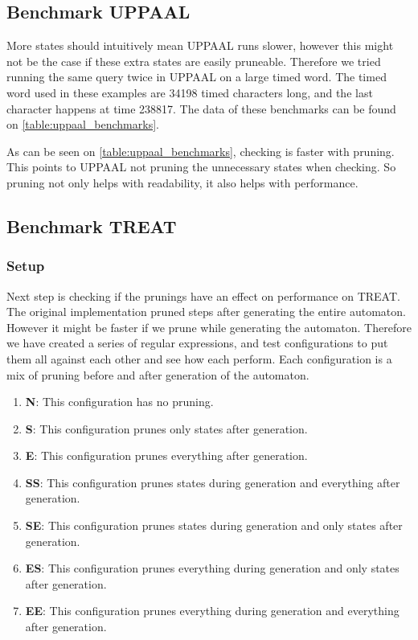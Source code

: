 \subsection{Benchmark UPPAAL}\label{sub:benchmark_uppaal}
More states should intuitively mean UPPAAL runs slower, however this might not be the case if these extra states are easily pruneable.
Therefore we tried running the same query twice in UPPAAL on a large timed word.
The timed word used in these examples are 34198 timed characters long, and the last character happens at time 238817.
The data of these benchmarks can be found on \cref{table:uppaal_benchmarks}.



As can be seen on \cref{table:uppaal_benchmarks}, checking is faster with pruning.
This points to UPPAAL not pruning the unnecessary states when checking.
So pruning not only helps with readability, it also helps with performance. 

\subsection{Benchmark TREAT}
\subsubsection{Setup}
Next step is checking if the prunings have an effect on performance on TREAT.
The original implementation pruned steps after generating the entire automaton.
However it might be faster if we prune while generating the automaton.
Therefore we have created a series of regular expressions, and test configurations to put them all against each other and see how each perform.
Each configuration is a mix of pruning before and after generation of the automaton.

\begin{enumerate}
    \item \textbf{N}: This configuration has no pruning.
    \item \textbf{S}: This configuration prunes only states after generation.
    \item \textbf{E}: This configuration prunes everything after generation.
    \item \textbf{SS}: This configuration prunes states during generation and everything after generation.
    \item \textbf{SE}: This configuration prunes states during generation and only states after generation.
    \item \textbf{ES}: This configuration prunes everything during generation and only states after generation.
    \item \textbf{EE}: This configuration prunes everything during generation and everything after generation.
\end{enumerate}

